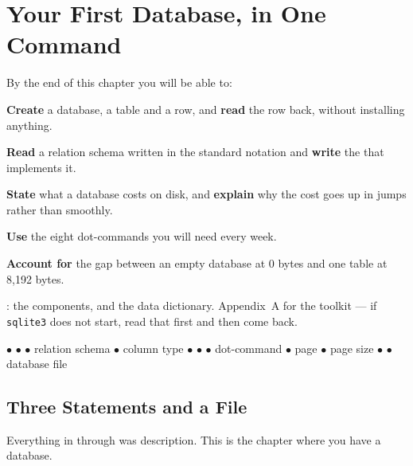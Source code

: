\chapter{Your First Database, in One Command}\label{ch:firstdatabase}

\begin{outcomes}
By the end of this chapter you will be able to:
\begin{tight}
  \item \textbf{Create} a database, a table and a row, and \textbf{read} the
        row back, without installing anything.
  \item \textbf{Read} a relation schema written in the standard notation and
        \textbf{write} the  that implements it.
  \item \textbf{State} what a database costs on disk, and \textbf{explain} why
        the cost goes up in jumps rather than smoothly.
  \item \textbf{Use} the eight dot-commands you will need every week.
  \item \textbf{Account for} the gap between an empty database at 0 bytes and
        one table at 8{,}192 bytes.
\end{tight}
\end{outcomes}

\begin{prereq}
: the components, and the data dictionary. Appendix~A for
the toolkit --- if \texttt{sqlite3} does not start, read that first and then
come back.
\end{prereq}

\begin{keyterms}
 $\bullet$  $\bullet$ 
$\bullet$ relation schema $\bullet$ column type $\bullet$ 
$\bullet$  $\bullet$ dot-command $\bullet$ page $\bullet$ page
size $\bullet$  $\bullet$ database file
\end{keyterms}

\section{Three Statements and a File}

Everything in  through  was description.
This is the chapter where you have a database.

